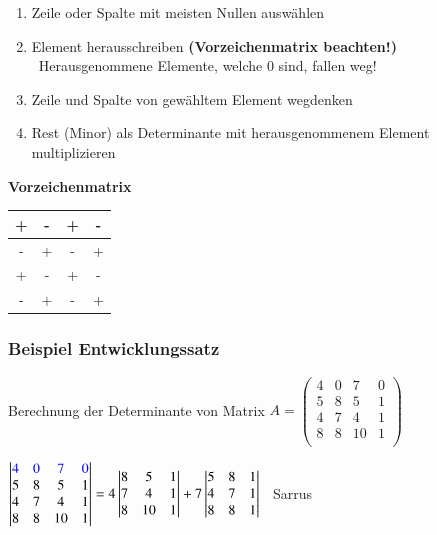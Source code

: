 \begin{enumerate}
	\item Zeile oder Spalte mit meisten Nullen auswählen
	\item Element herausschreiben \textbf{(Vorzeichenmatrix beachten!)} \\
		\textrightarrow\ Herausgenommene Elemente, welche 0 sind, fallen weg!
	\item Zeile und Spalte von gewähltem Element wegdenken
	\item Rest (Minor) als Determinante mit herausgenommenem Element multiplizieren
\end{enumerate}

\vspace{0.2em}
	
\textbf{Vorzeichenmatrix}
\vspace{0.2cm}
		
\begin{tabular}{| c | c | c | c |}
	\hline
	+ & - & + & - \\
	\hline
	- & + & - & + \\
	\hline
	+ & - & + & - \\
	\hline
	- & + & - & + \\
	\hline
\end{tabular}
					

\subsubsection{Beispiel Entwicklungssatz}

Berechnung der Determinante von Matrix $A =
\begin{pmatrix}
	4 & 0 & 7 & 0 \\
	5 & 8 & 5 & 1 \\
	4 & 7 & 4 & 1 \\
	8 & 8 & 10 & 1 \\
\end{pmatrix}$
				
\vspace{0cm}
		
$\begin{vmatrix}
	{\color{blue}4} & {\color{blue}0} & {\color{blue}7} & {\color{blue}0} \\
		5 & 8 & 5  & 1 \\
		4 & 7 & 4  & 1 \\
		8 & 8 & 10 & 1 
\end{vmatrix} 
	=  4 	
\begin{vmatrix}
	8 & 5  & 1 \\
	7 & 4  & 1 \\
	8 & 10 & 1 
\end{vmatrix} 
+ 7 
\begin{vmatrix}
	5 & 8 & 1 \\
	4 & 7 & 1 \\
	8 & 8 & 1 
\end{vmatrix}$ 
\qquad \textrightarrow\ Sarrus 					 		    
		

